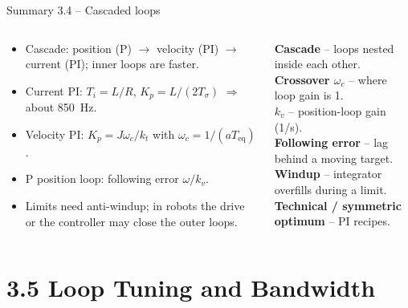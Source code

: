 \documentclass[aspectratio=169,10pt]{beamer}
\begin{document}
\begin{frame}{Summary 3.4 -- Cascaded loops}
\begin{columns}[T,onlytextwidth]
\begin{keybox}
\small
\begin{itemize}
\item Cascade: position (P) $\rightarrow$ velocity (PI) $\rightarrow$ current (PI); inner loops are faster.
\item Current PI: $T_i=L/R$, $K_p=L/(2T_\sigma)$ $\Rightarrow$ about \SI{850}{Hz}.
\item Velocity PI: $K_p=J\omega_c/k_t$ with $\omega_c=1/(aT_\text{eq})$.
\item P position loop: following error $\omega/k_v$.
\item Limits need anti-windup; in robots the drive or the controller may close the outer loops.
\end{itemize}
\end{keybox}
\begin{defbox}
\small
\textbf{Cascade} -- loops nested inside each other.\\
\textbf{Crossover $\omega_c$} -- where loop gain is 1.\\
\textbf{$k_v$} -- position-loop gain (1/s).\\
\textbf{Following error} -- lag behind a moving target.\\
\textbf{Windup} -- integrator overfills during a limit.\\
\textbf{Technical / symmetric optimum} -- PI recipes.
\end{defbox}
\end{columns}
\end{frame}

\section{3.5 Loop Tuning and Bandwidth}
\end{document}
